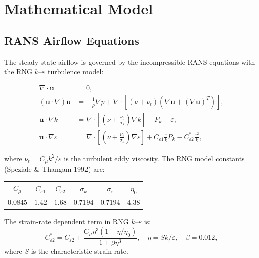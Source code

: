 \documentclass[12pt]{article}
\begin{document}
\section{Mathematical Model}

\subsection{RANS Airflow Equations}

The steady-state airflow is governed by the incompressible RANS equations with the RNG $k$--$\varepsilon$ turbulence model:

\begin{align}
    \nabla \cdot \mathbf{u} &= 0, \label{eq:continuity} \\
    (\mathbf{u} \cdot \nabla) \mathbf{u} &= -\frac{1}{\rho} \nabla p + \nabla \cdot \left[ (\nu + \nu_t) \left( \nabla \mathbf{u} + (\nabla \mathbf{u})^T \right) \right], \label{eq:momentum} \\
    \mathbf{u} \cdot \nabla k &= \nabla \cdot \left[ \left( \nu + \frac{\nu_t}{\sigma_k} \right) \nabla k \right] + P_k - \varepsilon, \label{eq:k} \\
    \mathbf{u} \cdot \nabla \varepsilon &= \nabla \cdot \left[ \left( \nu + \frac{\nu_t}{\sigma_\varepsilon} \right) \nabla \varepsilon \right] + C_{\varepsilon 1} \frac{\varepsilon}{k} P_k - C_{\varepsilon 2}^* \frac{\varepsilon^2}{k}, \label{eq:eps}
\end{align}

where $\nu_t = C_\mu k^2 / \varepsilon$ is the turbulent eddy viscosity. The RNG model constants (Speziale \& Thangam 1992) are:

\begin{center}
\begin{tabular}{cccccc}
\toprule
$C_\mu$ & $C_{\varepsilon 1}$ & $C_{\varepsilon 2}$ & $\sigma_k$ & $\sigma_\varepsilon$ & $\eta_0$ \\
\midrule
$0.0845$ & $1.42$ & $1.68$ & $0.7194$ & $0.7194$ & $4.38$ \\
\bottomrule
\end{tabular}
\end{center}

The strain-rate dependent term in RNG $k$--$\varepsilon$ is:
\begin{equation}
    C_{\varepsilon 2}^* = C_{\varepsilon 2} + \frac{C_\mu \eta^3 (1 - \eta/\eta_0)}{1 + \beta \eta^3}, \quad \eta = S k / \varepsilon, \quad \beta = 0.012,
\end{equation}
where $S$ is the characteristic strain rate.
\end{document}
